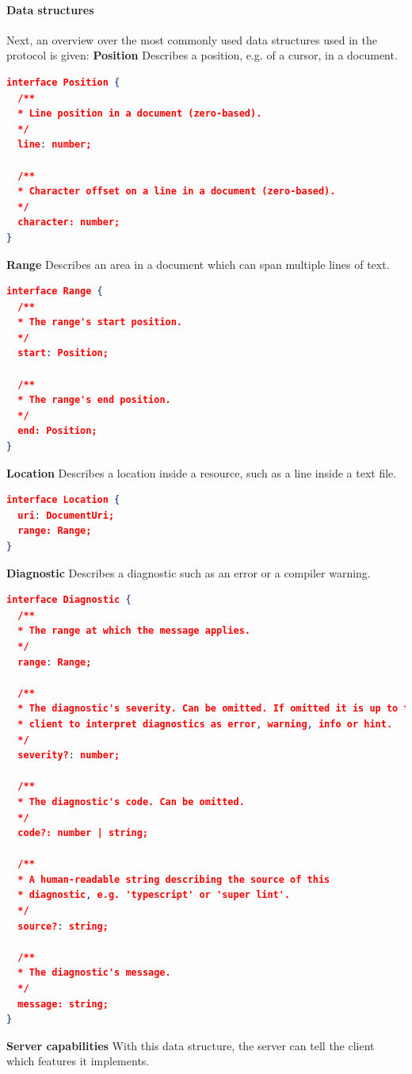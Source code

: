 \paragraph{Data structures}
Next, an overview over the most commonly used data structures used in the protocol is given: \newline
\textbf{Position}
Describes a position, e.g. of a cursor, in a document.
\begin{lstlisting}[language=json,firstnumber=1]
interface Position {
  /**
  * Line position in a document (zero-based).
  */
  line: number;

  /**
  * Character offset on a line in a document (zero-based).
  */
  character: number;
}
\end{lstlisting}
\textbf{Range}
Describes an area in a document which can span multiple lines of text.
\begin{lstlisting}[language=json,firstnumber=1]
interface Range {
  /**
  * The range's start position.
  */
  start: Position;

  /**
  * The range's end position.
  */
  end: Position;
}
\end{lstlisting}
\textbf{Location}
Describes a location inside a resource, such as a line inside a text file.
\begin{lstlisting}[language=json,firstnumber=1]
interface Location {
  uri: DocumentUri;
  range: Range;
}
\end{lstlisting}
\textbf{Diagnostic}
Describes a diagnostic such as an error or a compiler warning.
\begin{lstlisting}[language=json,firstnumber=1]
interface Diagnostic {
  /**
  * The range at which the message applies.
  */
  range: Range;

  /**
  * The diagnostic's severity. Can be omitted. If omitted it is up to the
  * client to interpret diagnostics as error, warning, info or hint.
  */
  severity?: number;

  /**
  * The diagnostic's code. Can be omitted.
  */
  code?: number | string;

  /**
  * A human-readable string describing the source of this
  * diagnostic, e.g. 'typescript' or 'super lint'.
  */
  source?: string;

  /**
  * The diagnostic's message.
  */
  message: string;
}
\end{lstlisting}
\textbf{Server capabilities}
With this data structure, the server can tell the client which features it implements. 
